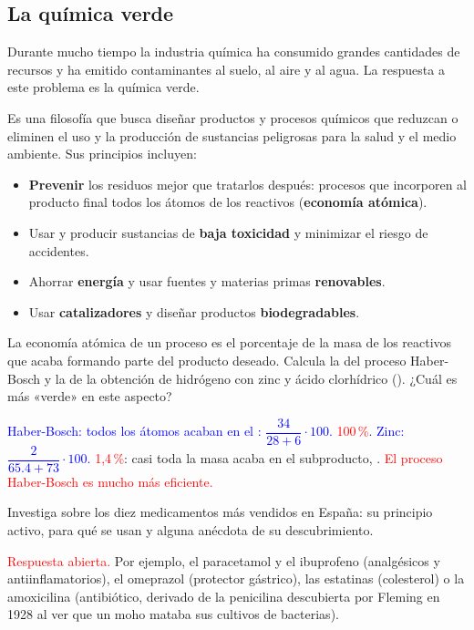 \subsection{La química verde}

Durante mucho tiempo la industria química ha consumido grandes cantidades de recursos y ha emitido contaminantes al suelo, al aire
y al agua. La respuesta a este problema es la química verde.

\begin{definition}
    Es una filosofía que busca diseñar productos y procesos químicos que reduzcan o eliminen el uso y la producción de sustancias
    peligrosas para la salud y el medio ambiente. Sus principios incluyen:
    \begin{itemize}
        \item \textbf{Prevenir} los residuos mejor que tratarlos después: procesos que incorporen al producto final todos los
        átomos de los reactivos (\textbf{economía atómica}).
        \item Usar y producir sustancias de \textbf{baja toxicidad} y minimizar el riesgo de accidentes.
        \item Ahorrar \textbf{energía} y usar fuentes y materias primas \textbf{renovables}.
        \item Usar \textbf{catalizadores} y diseñar productos \textbf{biodegradables}.
    \end{itemize}
\end{definition}

\begin{exercise}
    La economía atómica de un proceso es el porcentaje de la masa de los reactivos que acaba formando parte del producto deseado.
    Calcula la del proceso Haber-Bosch y la de la obtención de hidrógeno con zinc y ácido clorhídrico
    (). ¿Cuál es más «verde» en este aspecto?
    \begin{solu}
        \textcolor{blue}{Haber-Bosch: todos los átomos acaban en el : \(\dfrac{34}{28 + 6} \cdot 100\).} \textcolor{red}{100\,\%}.
        \textcolor{blue}{Zinc: \(\dfrac{2}{\num{65.4} + 73} \cdot 100\).} \textcolor{red}{1,4\,\%}: casi toda la masa acaba en el
        subproducto, . \textcolor{red}{El proceso Haber-Bosch es mucho más eficiente.}
    \end{solu}
\end{exercise}

\begin{exercise}
    Investiga sobre los diez medicamentos más vendidos en España: su principio activo, para qué se usan y alguna anécdota de su
    descubrimiento.
    \begin{solu}
        \textcolor{red}{Respuesta abierta.} Por ejemplo, el paracetamol y el ibuprofeno (analgésicos y antiinflamatorios), el
        omeprazol (protector gástrico), las estatinas (colesterol) o la amoxicilina (antibiótico, derivado de la penicilina
        descubierta por Fleming en 1928 al ver que un moho mataba sus cultivos de bacterias).
    \end{solu}
\end{exercise}


